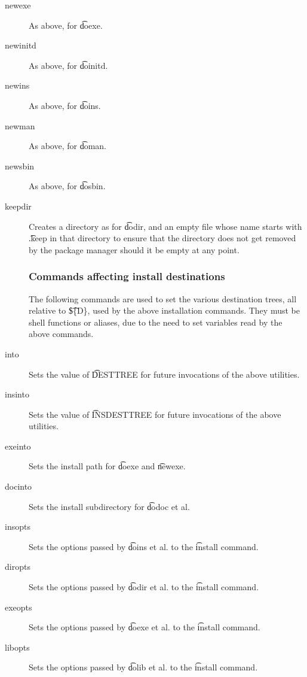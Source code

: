 \begin{description}
\item[newexe] As above, for \t{doexe}.

\item[newinitd] As above, for \t{doinitd}.

\item[newins] As above, for \t{doins}.

\item[newman] As above, for \t{doman}.

\item[newsbin] As above, for \t{dosbin}.

\item[keepdir] Creates a directory as for \t{dodir}, and an empty file whose name starts with
    \t{.keep} in that directory to ensure that the directory does not get removed by the
    package manager should it be empty at any point.

\subsubsection{Commands affecting install destinations}
The following commands are used to set the various destination trees, all relative to \t{\$\{D\}},
used by the above installation commands. They must be shell functions or aliases, due to the need to
set variables read by the above commands.

\item[into] Sets the value of \t{DESTTREE} for future invocations of the above utilities.

\item[insinto] Sets the value of \t{INSDESTTREE} for future invocations of the above utilities.

\item[exeinto] Sets the install path for \t{doexe} and \t{newexe}.

\item[docinto] Sets the install subdirectory for \t{dodoc} et al.

\item[insopts] Sets the options passed by \t{doins} et al. to the \t{install} command.

\item[diropts] Sets the options passed by \t{dodir} et al. to the \t{install} command.

\item[exeopts] Sets the options passed by \t{doexe} et al. to the \t{install} command.

\item[libopts] Sets the options passed by \t{dolib} et al. to the \t{install} command.

\end{description}

